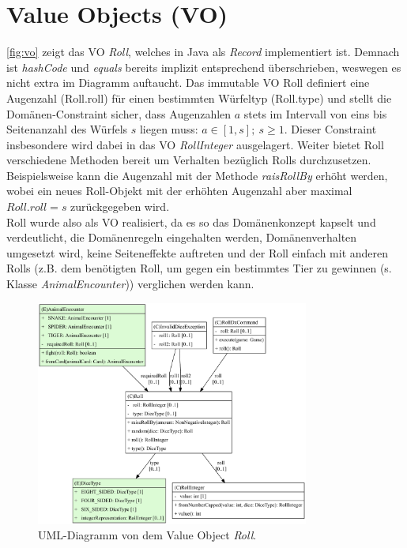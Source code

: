\section{Value Objects (VO)}

\autoref{fig:vo} zeigt das VO \textit{Roll}, welches in Java als \textit{Record} implementiert ist. Demnach ist \textit{hashCode} und 
\textit{equals} bereits implizit entsprechend überschrieben, weswegen es nicht extra im Diagramm auftaucht. Das immutable VO 
Roll definiert eine Augenzahl (Roll.roll) für einen bestimmten Würfeltyp (Roll.type) und stellt die Domänen-Constraint sicher, 
dass Augenzahlen $a$ stets im Intervall von eins bis Seitenanzahl des Würfels $s$ liegen muss: $a \in [1, s];~ s \geq 1$. 
Dieser Constraint insbesondere wird dabei in das VO \textit{RollInteger} ausgelagert. Weiter bietet Roll verschiedene Methoden 
bereit um Verhalten bezüglich Rolls durchzusetzen. Beispielsweise kann die Augenzahl mit der Methode \textit{raisRollBy} 
erhöht werden, wobei ein neues Roll-Objekt mit der erhöhten Augenzahl aber maximal $Roll.roll = s$ zurückgegeben wird. \\
Roll wurde also als VO realisiert, da es so das Domänenkonzept kapselt und verdeutlicht, die Domänenregeln eingehalten werden, 
Domänenverhalten umgesetzt wird, keine Seiteneffekte auftreten und der Roll einfach mit anderen Rolls (z.B. dem benötigten Roll, 
um gegen ein bestimmtes Tier zu gewinnen (s. Klasse \textit{AnimalEncounter})) verglichen werden kann.

\begin{figure}[H]
	\centering
	\includegraphics[width=0.8\textwidth]{Bilder/Roll_structure.pdf} 
	\caption{UML-Diagramm von dem Value Object \textit{Roll}.}
	\label{fig:vo}
\end{figure} 


